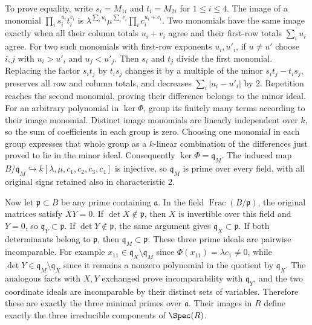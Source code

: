 \begin{example}
To prove equality, write $s_i=M_{1i}$ and $t_i=M_{2i}$ for
$1\leq i\leq4$. The image of a monomial
$\prod_i s_i^{u_i}t_i^{v_i}$ is
$\lambda^{\sum_i u_i}\mu^{\sum_i v_i}\prod_i c_i^{u_i+v_i}$.
Two monomials have the same image exactly when all their column
totals $u_i+v_i$ agree and their first-row totals $\sum_i u_i$ agree.
For two such monomials with first-row exponents $u_i,u'_i$, if
$u\ne u'$ choose $i,j$ with $u_i>u'_i$ and $u_j<u'_j$.
Then $s_i$ and $t_j$ divide the first monomial. Replacing the factor
$s_it_j$ by $t_is_j$ changes it by a multiple of the minor
$s_it_j-t_is_j$, preserves all row and column totals, and decreases
$\sum_i|u_i-u'_i|$ by $2$. Repetition reaches the second monomial,
proving their difference belongs to the minor ideal.
For an arbitrary polynomial in $\ker\Phi$, group its finitely many
terms according to their image monomial. Distinct image monomials
are linearly independent over $k$, so the sum of coefficients in
each group is zero. Choosing one monomial in each group expresses
that whole group as a $k$-linear combination of the differences
just proved to lie in the minor ideal. Consequently
$\ker\Phi=\mathfrak q_M$. The induced map
$B/\mathfrak q_M\hookrightarrow k[\lambda,\mu,c_1,c_2,c_3,c_4]$
is injective, so $\mathfrak q_M$ is prime over every field,
with all original signs retained also in characteristic $2$.

Now let $\mathfrak p\subset B$ be any prime containing
$\mathfrak a$. In the field $\operatorname{Frac}(B/\mathfrak p)$,
the original matrices satisfy $XY=0$. If $\det X\notin\mathfrak p$,
then $X$ is invertible over this field and $Y=0$, so
$\mathfrak q_Y\subset\mathfrak p$. If
$\det Y\notin\mathfrak p$, the same argument gives
$\mathfrak q_X\subset\mathfrak p$. If both determinants belong
to $\mathfrak p$, then $\mathfrak q_M\subset\mathfrak p$.
These three prime ideals are pairwise incomparable.
For example $x_{11}\in\mathfrak q_X\setminus\mathfrak q_M$
since $\Phi(x_{11})=\lambda c_1\ne0$, while
$\det Y\in\mathfrak q_M\setminus\mathfrak q_X$ since it remains
a nonzero polynomial in the quotient by $\mathfrak q_X$.
The analogous facts with $X,Y$ exchanged prove incomparability
with $\mathfrak q_Y$, and the two coordinate ideals are
incomparable by their distinct sets of variables.
Therefore these are exactly the three minimal primes over
$\mathfrak a$. Their images in $R$ define exactly the three
irreducible components of $\Spec(R)$.


\end{example}
